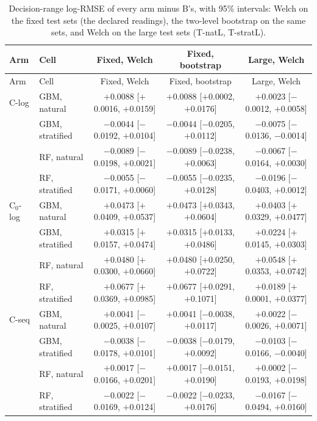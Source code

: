 \begin{longtable}{llccc}
\caption{Decision-range log-RMSE of every arm minus B's, with 95\% intervals: Welch on the fixed test sets (the declared readings), the two-level bootstrap on the same sets, and Welch on the large test sets (T-natL, T-stratL).}\label{tab:rev:decision-intervals}\\
\toprule
Arm & Cell & Fixed, Welch & Fixed, bootstrap & Large, Welch \\
\midrule
\endfirsthead
\toprule
Arm & Cell & Fixed, Welch & Fixed, bootstrap & Large, Welch \\
\midrule
\endhead
C-log & GBM, natural & $+$0.0088 [$+$0.0016, $+$0.0159] & $+$0.0088 [$+$0.0002, $+$0.0176] & $+$0.0023 [$-$0.0012, $+$0.0058] \\
 & GBM, stratified & $-$0.0044 [$-$0.0192, $+$0.0104] & $-$0.0044 [$-$0.0205, $+$0.0112] & $-$0.0075 [$-$0.0136, $-$0.0014] \\
 & RF, natural & $-$0.0089 [$-$0.0198, $+$0.0021] & $-$0.0089 [$-$0.0238, $+$0.0063] & $-$0.0067 [$-$0.0164, $+$0.0030] \\
 & RF, stratified & $-$0.0055 [$-$0.0171, $+$0.0060] & $-$0.0055 [$-$0.0235, $+$0.0128] & $-$0.0196 [$-$0.0403, $+$0.0012] \\
\addlinespace
C$_0$-log & GBM, natural & $+$0.0473 [$+$0.0409, $+$0.0537] & $+$0.0473 [$+$0.0343, $+$0.0604] & $+$0.0403 [$+$0.0329, $+$0.0477] \\
 & GBM, stratified & $+$0.0315 [$+$0.0157, $+$0.0474] & $+$0.0315 [$+$0.0133, $+$0.0486] & $+$0.0224 [$+$0.0145, $+$0.0303] \\
 & RF, natural & $+$0.0480 [$+$0.0300, $+$0.0660] & $+$0.0480 [$+$0.0250, $+$0.0722] & $+$0.0548 [$+$0.0353, $+$0.0742] \\
 & RF, stratified & $+$0.0677 [$+$0.0369, $+$0.0985] & $+$0.0677 [$+$0.0291, $+$0.1071] & $+$0.0189 [$+$0.0001, $+$0.0377] \\
\addlinespace
C-seq & GBM, natural & $+$0.0041 [$-$0.0025, $+$0.0107] & $+$0.0041 [$-$0.0038, $+$0.0117] & $+$0.0022 [$-$0.0026, $+$0.0071] \\
 & GBM, stratified & $-$0.0038 [$-$0.0178, $+$0.0101] & $-$0.0038 [$-$0.0179, $+$0.0092] & $-$0.0103 [$-$0.0166, $-$0.0040] \\
 & RF, natural & $+$0.0017 [$-$0.0166, $+$0.0201] & $+$0.0017 [$-$0.0151, $+$0.0190] & $+$0.0002 [$-$0.0193, $+$0.0198] \\
 & RF, stratified & $-$0.0022 [$-$0.0169, $+$0.0124] & $-$0.0022 [$-$0.0233, $+$0.0176] & $-$0.0167 [$-$0.0494, $+$0.0160] \\

\end{longtable}
